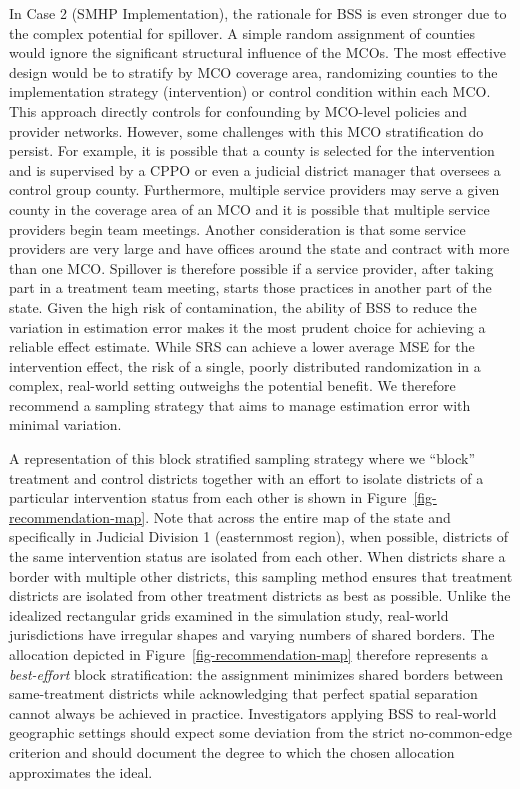 \documentclass[
  12pt,
  prelim]{bios-prelim}
\begin{document}
In Case 2 (SMHP Implementation), the rationale for BSS is even stronger
due to the complex potential for spillover. A simple random assignment
of counties would ignore the significant structural influence of the
MCOs. The most effective design would be to stratify by MCO coverage
area, randomizing counties to the implementation strategy (intervention)
or control condition within each MCO. This approach directly controls
for confounding by MCO-level policies and provider networks. However,
some challenges with this MCO stratification do persist. For example, it
is possible that a county is selected for the intervention and is
supervised by a CPPO or even a judicial district manager that oversees a
control group county. Furthermore, multiple service providers may serve
a given county in the coverage area of an MCO and it is possible that
multiple service providers begin team meetings. Another consideration is
that some service providers are very large and have offices around the
state and contract with more than one MCO. Spillover is therefore
possible if a service provider, after taking part in a treatment team
meeting, starts those practices in another part of the state. Given the
high risk of contamination, the ability of BSS to reduce the variation
in estimation error makes it the most prudent choice for achieving a
reliable effect estimate. While SRS can achieve a lower average MSE for
the intervention effect, the risk of a single, poorly distributed
randomization in a complex, real-world setting outweighs the potential
benefit. We therefore recommend a sampling strategy that aims to manage
estimation error with minimal variation.

A representation of this block stratified sampling strategy where we
``block'' treatment and control districts together with an effort to
isolate districts of a particular intervention status from each other is
shown in Figure~\ref{fig-recommendation-map}. Note that across the
entire map of the state and specifically in Judicial Division 1
(easternmost region), when possible, districts of the same intervention
status are isolated from each other. When districts share a border with
multiple other districts, this sampling method ensures that treatment
districts are isolated from other treatment districts as best as
possible. Unlike the idealized rectangular grids examined in the
simulation study, real-world jurisdictions have irregular shapes and
varying numbers of shared borders. The allocation depicted in
Figure~\ref{fig-recommendation-map} therefore represents a
\emph{best-effort} block stratification: the assignment minimizes shared
borders between same-treatment districts while acknowledging that
perfect spatial separation cannot always be achieved in practice.
Investigators applying BSS to real-world geographic settings should
expect some deviation from the strict no-common-edge criterion and
should document the degree to which the chosen allocation approximates
the ideal.
\end{document}
